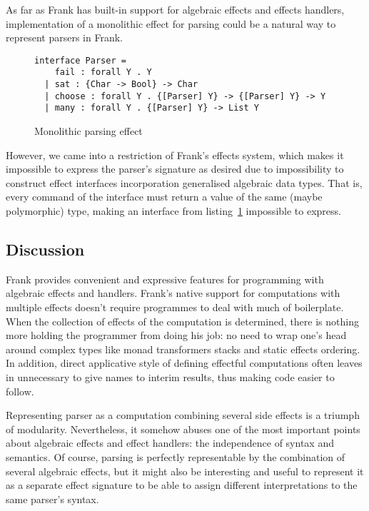     As far as Frank has built-in support for algebraic effects and effects handlers,
    implementation of a monolithic effect for parsing could be a natural way to
    represent parsers in Frank.

    \begin{figure}[h]
    \begin{lstlisting}
interface Parser =
    fail : forall Y . Y
  | sat : {Char -> Bool} -> Char
  | choose : forall Y . {[Parser] Y} -> {[Parser] Y} -> Y
  | many : forall Y . {[Parser] Y} -> List Y
    \end{lstlisting}
    \caption{Monolithic parsing effect}
    \label{listing:parserEffMono}
    \end{figure}

    However, we came into a restriction of Frank's
    effects system, which makes it impossible to express the parser's signature
    as desired due to impossibility to construct effect interfaces incorporation
    generalised algebraic data types. That is, every command of the interface must
    return a value of the same (maybe polymorphic) type, making an interface from
    listing~\ref{listing:parserEffMono} impossible to express.

   \subsection{Discussion}

    Frank provides convenient and expressive features for programming with
    algebraic effects and handlers. Frank's native support for computations with
    multiple effects doesn't require programmes to deal with much of boilerplate.
    When the collection of effects of the computation is determined, there is nothing
    more holding the programmer from doing his job: no need to wrap one's head around
    complex types like monad transformers stacks and static effects ordering.
    In addition, direct applicative style of defining effectful computations often
    leaves in unnecessary to give names to interim results, thus making code
    easier to follow.

    Representing parser as a computation combining several side effects is a
    triumph of modularity. Nevertheless, it somehow abuses one of the most important
    points about algebraic effects and effect handlers: the independence of
    syntax and semantics. Of course, parsing is perfectly representable by the
    combination of several algebraic effects, but it might also be interesting
    and useful to represent it as a separate effect signature to be able to assign
    different interpretations to the same parser's syntax.

